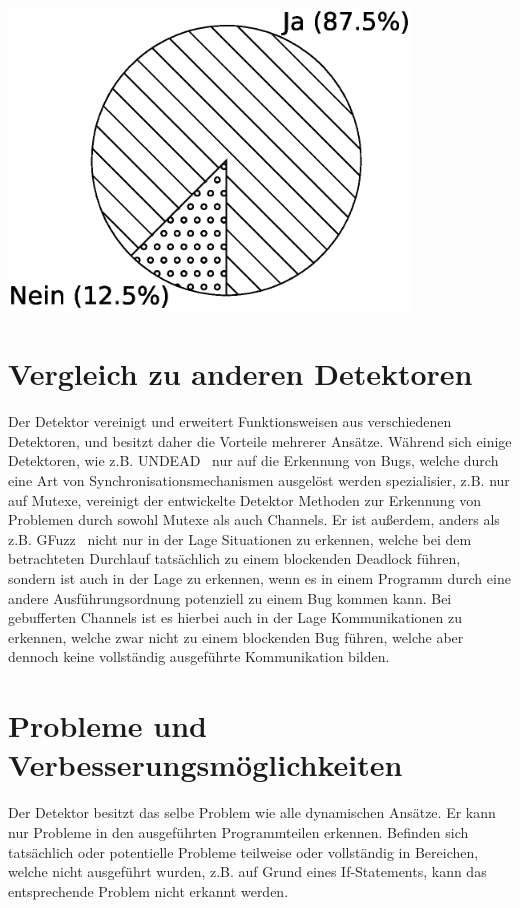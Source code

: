 \hfill
\begin{minipage}{0.45\textwidth}
  \centering
  \includegraphics[width=0.8\textwidth]{img/pi_goker_mix.eps}
  \label{Chap:Eval-Sec:Goker-Fig:Mix}
\end{minipage}

\section{Vergleich zu anderen Detektoren}
Der Detektor vereinigt und erweitert Funktionsweisen aus verschiedenen 
Detektoren, und besitzt daher die Vorteile mehrerer Ansätze. Während sich 
einige Detektoren, wie z.B. UNDEAD~\cite{Undead} nur auf die Erkennung 
von Bugs, welche durch eine Art von Synchronisationsmechanismen ausgelöst werden 
spezialisier, z.B. nur auf Mutexe,
vereinigt der entwickelte Detektor Methoden zur Erkennung von Problemen 
durch sowohl Mutexe als auch Channels. Er ist außerdem, anders als z.B. 
GFuzz~\cite{gfuzz} nicht nur in der Lage Situationen zu erkennen, welche 
bei dem betrachteten Durchlauf tatsächlich zu einem blockenden 
Deadlock führen, sondern ist auch in der Lage zu erkennen, wenn es in einem 
Programm durch eine andere Ausführungsordnung potenziell zu einem 
Bug kommen kann. Bei gebufferten Channels ist es hierbei auch in der Lage
Kommunikationen zu erkennen, welche zwar nicht zu einem blockenden 
Bug führen, welche aber dennoch keine vollständig ausgeführte Kommunikation 
bilden. 

\section{Probleme und Verbesserungsmöglichkeiten}
Der Detektor besitzt das selbe Problem wie alle dynamischen Ansätze. Er 
kann nur Probleme in den ausgeführten Programmteilen erkennen. Befinden sich 
tatsächlich oder potentielle Probleme teilweise oder vollständig in Bereichen, 
welche nicht ausgeführt wurden, z.B. auf Grund eines If-Statements, 
kann das entsprechende Problem nicht erkannt werden.

